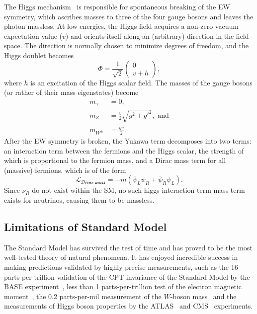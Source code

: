 The Higgs mechanism~\cite{PhysRevLett.13.508, PhysRevLett.13.321} is responsible for spontaneous breaking of the EW symmetry, which ascribes masses to three of the four gauge bosons and leaves the photon massless. At low energies, the Higgs field acquires a non-zero vacuum expectation value ($v$) and orients itself along an (arbitrary) direction in the field space. The direction is normally chosen to minimize degrees of freedom, and the Higgs doublet becomes
\begin{equation}\label{eq:higgs_vev}
    \Phi = \frac{1}{\sqrt{2}}\left(\begin{array}{c} 0 \\ v+h \end{array}\right),
\end{equation}
where $h$ is an excitation of the Higgs scalar field. The masses of the gauge bosons (or rather of their mass eigenstates) become
\begin{equation}
\begin{split}
m_\gamma &= 0, \\
m_Z &= \frac{v}{2}\sqrt{g^2 + g'^2}, \text{ and} \\
m_{W^\pm} &=  \frac{gv}{2}.
\end{split}
\end{equation}
After the EW symmetry is broken, the Yukawa term decomposes into two terms: an interaction term between the fermions and the Higgs scalar, the strength of which is proportional to the fermion mass, and a Dirac mass term for all (massive) fermions, which is of the form
\begin{equation}
    \mathcal{L_\text{Dirac mass}} = -m (\bar{\psi}_L\psi_R + \bar{\psi}_R\psi_L).
\end{equation}
Since $\nu_R$ do not exist within the SM, no such higgs interaction term mass term exists for neutrinos, causing them to be massless.

\subsection{Limitations of Standard Model}
The Standard Model has survived the test of time and has proved to be the most well-tested theory of natural phenomena. It has enjoyed incredible success in making predictions validated by highly precise measurements, such as the 16 parts-per-trillion validation of the CPT invariance of the Standard Model by the BASE experiment~\cite{Borchert2022}, less than 1 parts-per-trillion test of the electron magnetic moment~\cite{PhysRevA.83.052122}, the 0.2 parts-per-mil measurement of the $W$-boson mass~\cite{atlascollaboration2024measurement} and the measurements of Higgs boson properties by the ATLAS~\cite{ATLASNature} and CMS~\cite{CMSNature} experiments.


